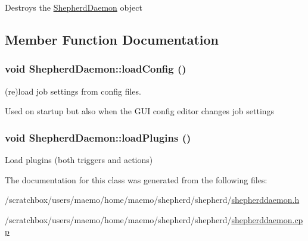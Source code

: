 Destroys the \hyperlink{class_shepherd_daemon}{ShepherdDaemon} object 

\subsection{Member Function Documentation}
\hypertarget{class_shepherd_daemon_2738c4b68ae3038188c87d7c6512e62f}{
\subsubsection[{loadConfig}]{\setlength{\rightskip}{0pt plus 5cm}void ShepherdDaemon::loadConfig ()}}
\label{class_shepherd_daemon_2738c4b68ae3038188c87d7c6512e62f}


(re)load job settings from config files. 

Used on startup but also when the GUI config editor changes job settings \hypertarget{class_shepherd_daemon_39a63b10905db37058532a2571b001be}{
\subsubsection[{loadPlugins}]{\setlength{\rightskip}{0pt plus 5cm}void ShepherdDaemon::loadPlugins ()}}
\label{class_shepherd_daemon_39a63b10905db37058532a2571b001be}


Load plugins (both triggers and actions) 

The documentation for this class was generated from the following files:\begin{CompactItemize}
\item 
/scratchbox/users/maemo/home/maemo/shepherd/shepherd/\hyperlink{shepherddaemon_8h}{shepherddaemon.h}\item 
/scratchbox/users/maemo/home/maemo/shepherd/shepherd/\hyperlink{shepherddaemon_8cpp}{shepherddaemon.cpp}\end{CompactItemize}
